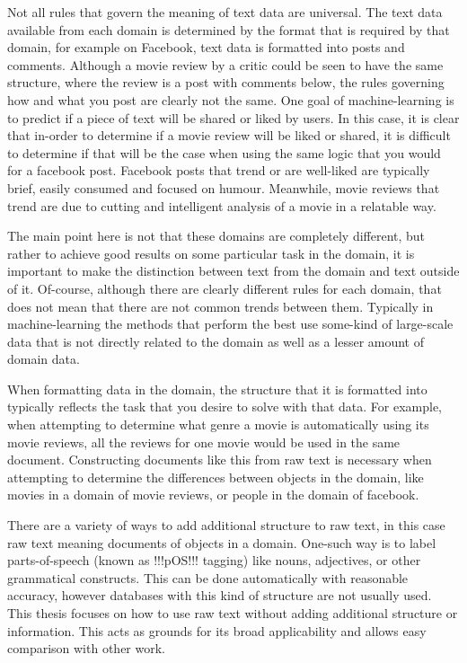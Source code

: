 Not all rules that govern the meaning of text data are universal. The text data available from each domain is determined by the format that is required by that domain, for example on Facebook, text data is formatted into posts and comments. Although a movie review by a critic could be seen to have the same structure, where the review is a post with comments below, the rules governing how and what you post are clearly not the same. One goal of machine-learning is to predict if a piece of text will be shared or liked by users. In this case, it is clear that in-order to determine if a movie review will be liked or shared, it is difficult to determine if that will be the case when using the same logic that you would for a facebook post. Facebook posts that trend or are well-liked are typically brief, easily consumed and focused on humour. Meanwhile, movie reviews that trend are due to cutting and intelligent analysis of a movie in a relatable way. %

The main point here is not that these domains are completely different, but rather to achieve good results on some particular task in the domain, it is important to make the distinction between text from the domain and text outside of it. Of-course, although there are clearly different rules for each domain, that does not mean that there are not common trends between them. Typically in machine-learning the methods that perform the best use some-kind of large-scale data that is not directly related to the domain as well as a lesser amount of domain data. 

When formatting data in the domain, the structure that it is formatted into typically reflects the task that you desire to solve with that data. For example, when attempting to determine what genre a movie is automatically using its movie reviews, all the reviews for one movie would be used in the same document. Constructing documents like this from raw text is necessary when attempting to determine the differences between objects in the domain, like movies in a domain of movie reviews, or people in the domain of facebook.

There are a variety of ways to add additional structure to raw text, in this case raw text meaning documents of objects in a domain. One-such way is to label parts-of-speech (known as !!!pOS!!! tagging) like nouns, adjectives, or other grammatical constructs. This can be done automatically with reasonable accuracy, however databases with this kind of structure are not usually used. This thesis focuses on how to use raw text without adding additional structure or information. This acts as grounds for its broad applicability and allows easy comparison with other work.

